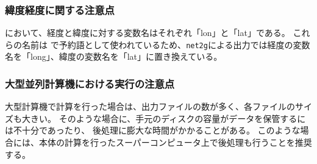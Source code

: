 
\subsubsection{緯度経度に関する注意点}
\scalerm において、経度と緯度に対する変数名はそれぞれ「lon」と「lat」である。
これらの名前は \grads で予約語として使われているため、\verb|net2g|による出力では経度の変数名を「long」、緯度の変数名を「lat」に置き換えている。

\subsubsection{大型並列計算機における実行の注意点}
大型計算機で計算を行った場合は、出力ファイルの数が多く、各ファイルのサイズも大きい。
そのような場合に、手元のディスクの容量がデータを保管するには不十分であったり、
後処理に膨大な時間がかかることがある。
このような場合には、\scalerm 本体の計算を行ったスーパーコンピュータ上で後処理も行うことを推奨する。




